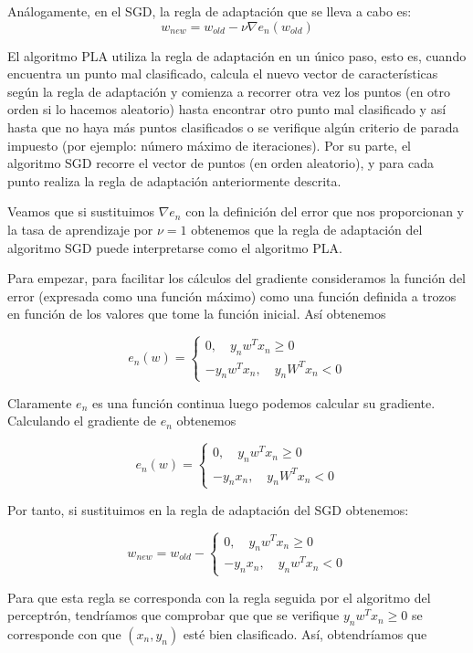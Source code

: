 \documentclass{article}
\begin{document}
Análogamente, en el SGD, la regla de adaptación que se lleva a cabo es:
\[
	w_{new} = w_{old} - \nu \nabla e_n(w_{old})
\]


El algoritmo PLA utiliza la regla de adaptación en un único paso, esto es, cuando encuentra un punto mal clasificado, calcula el nuevo vector de características según la regla de adaptación y comienza a recorrer otra vez los puntos (en otro orden si lo hacemos aleatorio) hasta encontrar otro punto mal clasificado y así hasta que no haya más puntos clasificados o se verifique algún criterio de parada impuesto (por ejemplo: número máximo de iteraciones). Por su parte, el algoritmo SGD recorre el vector de puntos (en orden aleatorio), y para cada punto realiza la regla de adaptación anteriormente descrita. 

Veamos que si sustituimos $\nabla e_n$ con la definición del error que nos proporcionan y la tasa de aprendizaje por $\nu = 1$ obtenemos que la regla de adaptación del algoritmo SGD puede interpretarse como el algoritmo PLA.

Para empezar, para facilitar los cálculos del gradiente consideramos la función del error (expresada como una función máximo) como una función definida a trozos en función de los valores que tome la función inicial. Así obtenemos

\[
	e_n(w) = \begin{cases}
		0, \quad y_nw^Tx_n \geq 0
		\\-y_nw^Tx_n, \quad y_nW^Tx_n < 0
	\end{cases}
\]

Claramente $e_n$ es una función continua luego podemos calcular su gradiente. Calculando el gradiente de $e_n$ obtenemos

\[
e_n(w) = \begin{cases}
0, \quad y_nw^Tx_n \geq 0
\\-y_nx_n, \quad y_nW^Tx_n < 0
\end{cases}
\]

Por tanto, si sustituimos en la regla de adaptación del SGD obtenemos:

\[	
	w_{new} = w_{old} - \begin{cases}
	0, \quad y_nw^Tx_n \geq 0
	\\-y_nx_n, \quad y_nw^Tx_n < 0
	\end{cases}
\]

Para que esta regla se corresponda con la regla seguida por el algoritmo del perceptrón, tendríamos que comprobar que que se verifique $y_nw^Tx_n \geq 0$ se corresponde con que  $(x_n, y_n)$ esté bien clasificado. Así, obtendríamos que 
\end{document}
